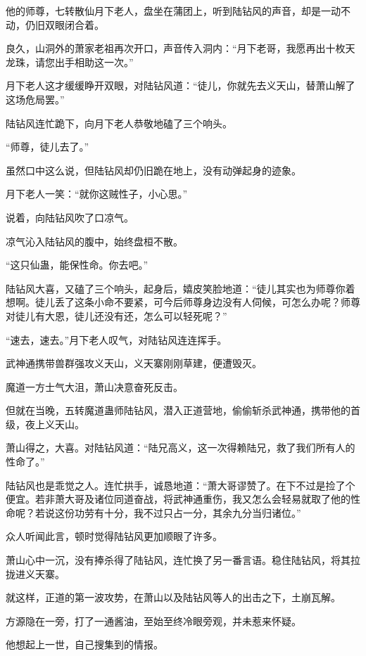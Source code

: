 
\begin{this_body}

他的师尊，七转散仙月下老人，盘坐在蒲团上，听到陆钻风的声音，却是一动不动，仍旧双眼闭合着。

良久，山洞外的萧家老祖再次开口，声音传入洞内：“月下老哥，我愿再出十枚天龙珠，请您出手相助这一次。”

月下老人这才缓缓睁开双眼，对陆钻风道：“徒儿，你就先去义天山，替萧山解了这场危局罢。”

陆钻风连忙跪下，向月下老人恭敬地磕了三个响头。

“师尊，徒儿去了。”

虽然口中这么说，但陆钻风却仍旧跪在地上，没有动弹起身的迹象。

月下老人一笑：“就你这贼性子，小心思。”

说着，向陆钻风吹了口凉气。

凉气沁入陆钻风的腹中，始终盘桓不散。

“这只仙蛊，能保性命。你去吧。”

陆钻风大喜，又磕了三个响头，起身后，嬉皮笑脸地道：“徒儿其实也为师尊你着想啊。徒儿丢了这条小命不要紧，可今后师尊身边没有人伺候，可怎么办呢？师尊对徒儿有大恩，徒儿还没有还，怎么可以轻死呢？”

“速去，速去。”月下老人叹气，对陆钻风连连挥手。

武神通携带兽群强攻义天山，义天寨刚刚草建，便遭毁灭。

魔道一方士气大沮，萧山决意奋死反击。

但就在当晚，五转魔道蛊师陆钻风，潜入正道营地，偷偷斩杀武神通，携带他的首级，夜上义天山。

萧山得之，大喜。对陆钻风道：“陆兄高义，这一次得赖陆兄，救了我们所有人的性命了。”

陆钻风也是乖觉之人。连忙拱手，诚恳地道：“萧大哥谬赞了。在下不过是捡了个便宜。若非萧大哥及诸位同道奋战，将武神通重伤，我又怎么会轻易就取了他的性命呢？若说这份功劳有十分，我不过只占一分，其余九分当归诸位。”

众人听闻此言，顿时觉得陆钻风更加顺眼了许多。

萧山心中一沉，没有捧杀得了陆钻风，连忙换了另一番言语。稳住陆钻风，将其拉拢进义天寨。

就这样，正道的第一波攻势，在萧山以及陆钻风等人的出击之下，土崩瓦解。

方源隐在一旁，打了一通酱油，至始至终冷眼旁观，并未惹来怀疑。

他想起上一世，自己搜集到的情报。


\end{this_body}
